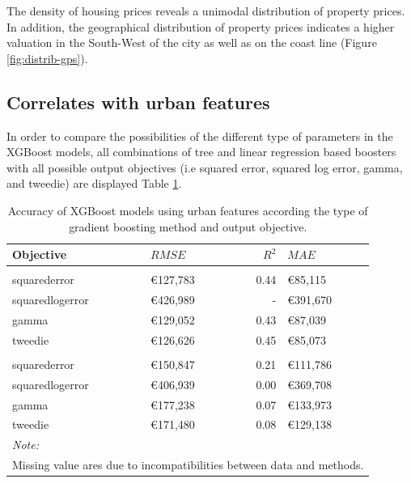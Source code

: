 \documentclass[conference,final,]{IEEEtran}
\begin{document}
The density of housing prices reveals a unimodal distribution of property prices. In addition, the geographical distribution of property prices indicates a higher valuation in the South-West of the city as well as on the coast line (Figure \ref{fig:distrib-gps}).

\hypertarget{correlates-with-urban-features}{%
\subsection{Correlates with urban features}\label{correlates-with-urban-features}}

In order to compare the possibilities of the different type of parameters in the XGBoost models,
all combinations of tree and linear regression based boosters with all possible output objectives (i.e squared error, squared log error, gamma, and tweedie) are displayed Table \ref{tab:osm-model-comparison}.

\begin{table}[H]

\caption{\label{tab:osm-model-comparison}Accuracy of XGBoost models using urban features according the type of gradient boosting method and output objective.}
\centering
\fontsize{8}{10}\selectfont
\begin{tabular}[t]{llrl}
\toprule
Objective & $RMSE$ & $R^2$ & $MAE$\\
\midrule
\addlinespace[0.3em]
\multicolumn{4}{l}{\textbf{Tree based}}\\
\hspace{1em}squarederror & €127,783 & 0.44 & €85,115\\
\hspace{1em}squaredlogerror & €426,989 & - & €391,670\\
\hspace{1em}gamma & €129,052 & 0.43 & €87,039\\
\hspace{1em}tweedie & €126,626 & 0.45 & €85,073\\
\addlinespace[0.3em]
\multicolumn{4}{l}{\textbf{Linear regression based}}\\
\hspace{1em}squarederror & €150,847 & 0.21 & €111,786\\
\hspace{1em}squaredlogerror & €406,939 & 0.00 & €369,708\\
\hspace{1em}gamma & €177,238 & 0.07 & €133,973\\
\hspace{1em}tweedie & €171,480 & 0.08 & €129,138\\
\bottomrule
\multicolumn{4}{l}{\textit{Note: }}\\
\multicolumn{4}{l}{Missing value ares due to incompatibilities between data and methods.}\\
\end{tabular}
\end{table}
\end{document}
